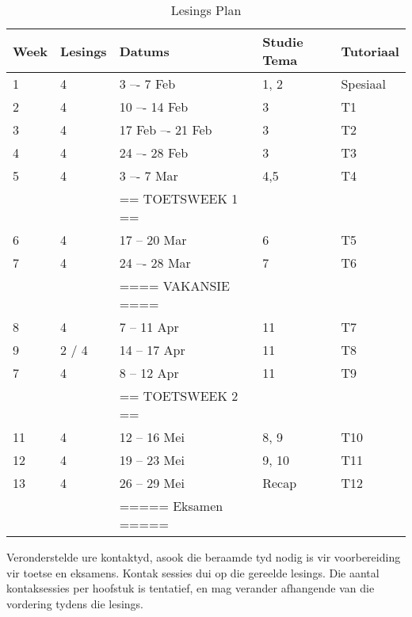         \begin{table}[!h]
            \begin{center}
             \begin{tabular}{|l|l|l|l|l|}
                 \hline
                 {\bf Week} & {\bf Lesings} & {\bf Datums} & {\bf Studie Tema} & {\bf Tutoriaal} \\
                 \hline
                 1  & 4     & 3 –- 7 Feb     & 1, 2  & Spesiaal \\
                 2  & 4     & 10 –- 14 Feb     & 3     & T1 \\
                 3  & 4     & 17 Feb –- 21 Feb  & 3  & T2 \\
                 4  & 4     & 24 –- 28 Feb       & 3     & T3 \\
                 5  & 4     & 3 –- 7 Mar       & 4,5     & T4 \\	
                    &       & == TOETSWEEK 1 == &       & \\
                 6  & 4     & 17 -- 20 Mar     & 6     & T5 \\
                 7 & 4     & 24 –- 28 Mar       & 7     & T6 \\	
                    &       & ==== VAKANSIE ==== &       & \\
                 8  & 4     & 7 -- 11 Apr      & 11  & T7 \\
                 9  & 2 / 4 & 14 -- 17 Apr       & 11     & T8 \\
                 7  & 4     & 8 -- 12 Apr      & 11  & T9 \\
                    &       & == TOETSWEEK 2 == &       & \\
                 11 & 4     & 12 -- 16 Mei     & 8, 9 & T10 \\
                 12 & 4     & 19 -- 23 Mei     & 9, 10    & T11 \\
                 13 & 4     & 26 -- 29 Mei     & Recap    & T12 \\
                    &       & ===== Eksamen ===== &       & \\
                 \hline
             \end{tabular}
             \caption{Lesings Plan} \label{tab:lec_plan}
            \end{center}
        \end{table}
        

	Veronderstelde ure kontaktyd, asook die beraamde tyd 
         nodig is vir voorbereiding vir toetse en eksamens. Kontak sessies dui 
         op die gereelde lesings. Die aantal kontaksessies per hoofstuk is 
         tentatief, en mag verander afhangende van die vordering tydens die lesings.

